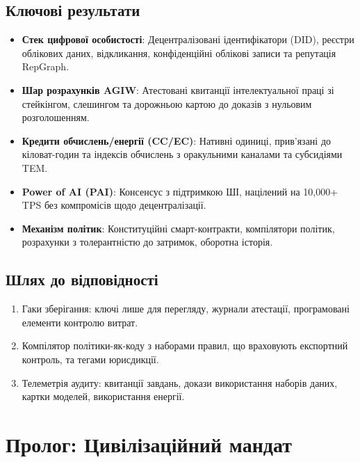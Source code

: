 \documentclass[11pt]{article}
\begin{document}
\subsection{Ключові результати}
\begin{itemize}[noitemsep]
  \item \textbf{Стек цифрової особистості}: Децентралізовані ідентифікатори (DID), реєстри облікових даних, відкликання, конфіденційні облікові записи та репутація RepGraph.
  \item \textbf{Шар розрахунків AGIW}: Атестовані квитанції інтелектуальної праці зі стейкінгом, слешингом та дорожньою картою до доказів з нульовим розголошенням.
  \item \textbf{Кредити обчислень/енергії (CC/EC)}: Нативні одиниці, прив'язані до кіловат-годин та індексів обчислень з оракульними каналами та субсидіями TEM.
  \item \textbf{Power of AI (PAI)}: Консенсус з підтримкою ШІ, націлений на 10,000+ TPS без компромісів щодо децентралізації.
  \item \textbf{Механізм політик}: Конституційні смарт-контракти, компілятори політик, розрахунки з толерантністю до затримок, оборотна історія.
\end{itemize}

\subsection{Шлях до відповідності}
\begin{enumerate}[noitemsep]
  \item Гаки зберігання: ключі лише для перегляду, журнали атестації, програмовані елементи контролю витрат.
  \item Компілятор політики-як-коду з наборами правил, що враховують експортний контроль, та тегами юрисдикції.
  \item Телеметрія аудиту: квитанції завдань, докази використання наборів даних, картки моделей, використання енергії.
\end{enumerate}

\section{Пролог: Цивілізаційний мандат}
\end{document}

